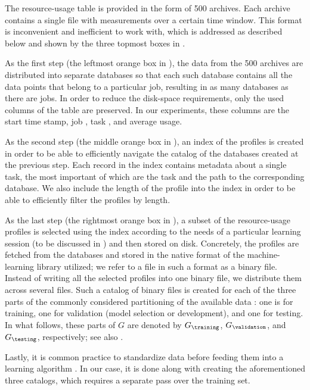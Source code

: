 The resource-usage table is provided in the form of 500 archives. Each archive
contains a single file with measurements over a certain time window. This format
is inconvenient and inefficient to work with, which is addressed as described
below and shown by the three topmost boxes in .

As the first step (the leftmost orange box in ), the data
from the 500 archives are distributed into separate databases so that each such
database contains all the data points that belong to a particular job, resulting
in as many databases as there are jobs. In order to reduce the disk-space
requirements, only the used columns of the table are preserved. In our
experiments, these columns are the start time stamp, job , task ,
and average  usage.

As the second step (the middle orange box in ), an index of
the profiles is created in order to be able to efficiently navigate the catalog
of the databases created at the previous step. Each record in the index contains
metadata about a single task, the most important of which are the task 
and the path to the corresponding database. We also include the length of the
profile into the index in order to be able to efficiently filter the profiles by
length.

As the last step (the rightmost orange box in ), a subset
of the resource-usage profiles is selected using the index according to the
needs of a particular learning session (to be discussed in )
and then stored on disk. Concretely, the profiles are fetched from the databases
and stored in the native format of the machine-learning library utilized; we
refer to a file in such a format as a binary file. Instead of writing all the
selected profiles into one binary file, we distribute them across several files.
Such a catalog of binary files is created for each of the three parts of the
commonly considered partitioning of the available data \cite{hastie2013}: one is
for training, one for validation (model selection or development), and one for
testing. In what follows, these parts of $G$ are denoted by $G_\training$,
$G_\validation$, and $G_\testing$, respectively; see also .

Lastly, it is common practice to standardize data before feeding them into a
learning algorithm \cite{hastie2013}. In our case, it is done along with
creating the aforementioned three catalogs, which requires a separate pass over
the training set.

